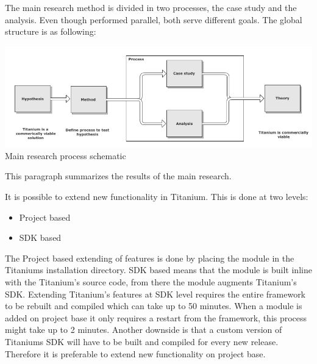 \noindent The main research method is divided in two processes, the case study and the analysis. Even though performed parallel, both serve different goals. The global structure is as following:\\

\begin{centering}
\includegraphics[scale=0.5]{images/process.png}\\{Main research process schematic}\\
\end{centering}





This paragraph summarizes the results of the main research.

It is possible to extend new functionality in Titanium. This is done at two levels:
\begin{itemize}
	\item Project based
	\item SDK based
\end{itemize}
The Project based extending of features is done by placing the module in the Titaniums installation directory. SDK based means that the module is built inline with the Titanium's source code, from there the module augments Titanium's SDK.  Extending Titanium's features at SDK level requires the entire framework to be rebuilt and compiled which can take up to 50 minutes. When a module is added on project base it only requires a restart from the framework, this process might take up to 2 minutes. Another downside is that a custom version of Titaniums SDK will have to be built and compiled for every new release. Therefore it is preferable to extend new functionality on project base.

